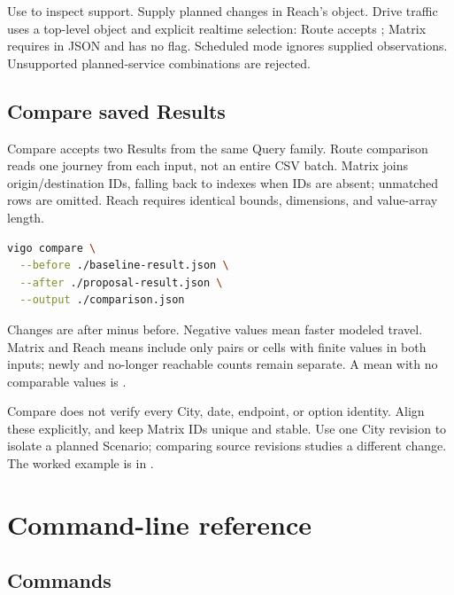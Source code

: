 \documentclass[10pt,letterpaper]{article}
\begin{document}
Use  to inspect support. Supply planned changes in Reach's  object. Drive traffic uses a top-level  object and explicit realtime selection: Route accepts ; Matrix requires  in JSON and has no  flag. Scheduled mode ignores supplied observations. Unsupported planned-service combinations are rejected.

\subsection{Compare saved Results}

Compare accepts two Results from the same Query family. Route comparison reads one journey from each input, not an entire CSV batch. Matrix joins origin/destination IDs, falling back to indexes when IDs are absent; unmatched rows are omitted. Reach requires identical bounds, dimensions, and value-array length.

\begin{lstlisting}[language=bash]
vigo compare \
  --before ./baseline-result.json \
  --after ./proposal-result.json \
  --output ./comparison.json
\end{lstlisting}

Changes are after minus before. Negative values mean faster modeled travel. Matrix and Reach means include only pairs or cells with finite values in both inputs; newly and no-longer reachable counts remain separate. A mean with no comparable values is .

Compare does not verify every City, date, endpoint, or option identity. Align these explicitly, and keep Matrix IDs unique and stable. Use one City revision to isolate a planned Scenario; comparing source revisions studies a different change. The worked example is in .

\section{Command-line reference}

\subsection{Commands}
\end{document}
